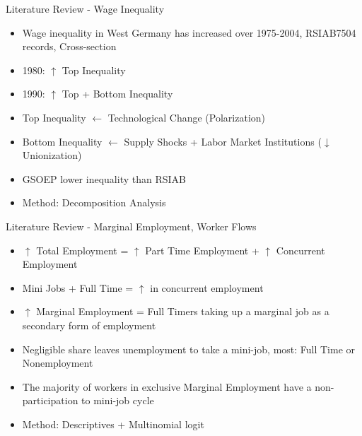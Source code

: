 \documentclass{beamer}
\let\oldcite=\cite
\renewcommand{\cite}[1]{\textcolor[rgb]{.0,.2,.7}{\oldcite{#1}}}
\begin{document}
\begin{frame}{Literature Review - Wage Inequality}
\cite{DuLuSc09}
\begin{itemize}
\setlength{\itemsep}{0.5 cm}
\item Wage inequality in West Germany has increased over
1975-2004, RSIAB7504 records, Cross-section
\item 1980: $\uparrow$ Top Inequality
\item 1990: $\uparrow$ Top + Bottom Inequality
\item Top Inequality $\leftarrow$ Technological Change (Polarization)
\item Bottom Inequality $\leftarrow$ Supply Shocks + Labor Market Institutions ($\downarrow$ Unionization)
\item GSOEP lower inequality than RSIAB
\item Method: Decomposition Analysis
\end{itemize}
\end{frame}


\begin{frame}{Literature Review - Marginal Employment, Worker Flows}
\cite{CarriTuRo15}
\begin{itemize}
\setlength{\itemsep}{0.5 cm}
\item $\uparrow$ Total Employment = $\uparrow$ Part Time Employment + $\uparrow$ Concurrent Employment 
\item Mini Jobs + Full Time = $\uparrow$ in concurrent employment
\item $\uparrow$ Marginal Employment = Full Timers taking up a marginal job as a secondary form of employment
\item Negligible share leaves unemployment to take a mini-job, most: Full Time or Nonemployment
\item The majority of workers in exclusive Marginal Employment have a non-participation to mini-job cycle
\item Method: Descriptives + Multinomial logit
\end{itemize}
\end{frame}
\end{document}
